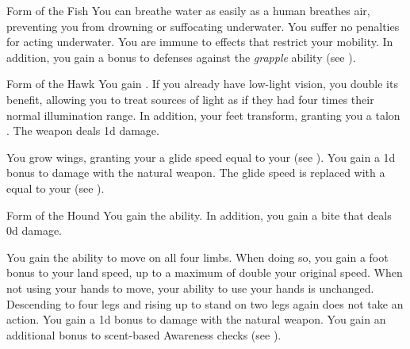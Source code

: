 {\begin{freeability}{Form of the Fish}
                \rankline
                 You can breathe water as easily as a human breathes air, preventing you from drowning or suffocating underwater.
                 You suffer no penalties for acting underwater.
                 You are immune to  effects that restrict your mobility.
                In addition, you gain a  bonus to defenses against the \textit{grapple} ability (see ).
            \end{freeability}

            \begin{freeability}{Form of the Hawk}
                You gain .
                If you already have low-light vision, you double its benefit, allowing you to treat sources of light as if they had four times their normal illumination range.
                In addition, your feet transform, granting you a talon .
                The weapon deals \minus1d damage.

                \rankline
                 You grow wings, granting your a glide speed equal to your  (see ).
                 You gain a \plus1d bonus to damage with the natural weapon.
                 The glide speed is replaced with a  equal to your  (see ).
            \end{freeability}

            \begin{freeability}{Form of the Hound}
                You gain the  ability.
                In addition, you gain a bite  that deals \plus0d damage.

                \rankline
                 You gain the ability to move on all four limbs.
                When doing so, you gain a  foot bonus to your land speed, up to a maximum of double your original speed.
                When not using your hands to move, your ability to use your hands is unchanged.
                Descending to four legs and rising up to stand on two legs again does not take an action.
                 You gain a \plus1d bonus to damage with the natural weapon.
                 You gain an additional  bonus to scent-based Awareness checks (see ).
            \end{freeability}

}

